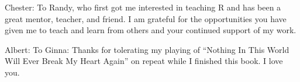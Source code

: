 \cleardoublepage\newpage
\thispagestyle{empty}

\vspace*{2in}

\begin{center}
Chester: To Randy, who first got me interested in teaching R and has been a great mentor, teacher, and friend. I am grateful for the opportunities you have given me to teach and learn from others and your continued support of my work.

\vspace{0.3in}

Albert:  \selectfont To Ginna: Thanks for tolerating my playing of ``Nothing In This World Will Ever Break My Heart Again'' on repeat while I finished this book. I love you.
\end{center}

\setlength{\abovedisplayskip}{-5pt}
\setlength{\abovedisplayshortskip}{-5pt}

